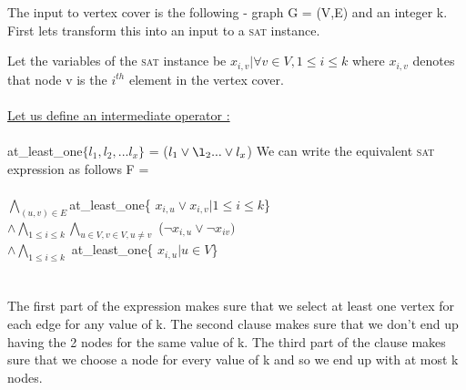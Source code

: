\documentclass[11pt]{article}
\begin{document}
The input to vertex cover is the following - graph G = (V,E) and an integer k. First lets transform this into an input to a \textsc{sat} instance.

Let the variables of the \textsc{sat} instance be $x_{i,v} |  \forall v \in V , 1 \leq i \leq k$ where $x_{i,v}$ denotes that node v is the $i^{th}$ element in the vertex cover.\\\\
\underline{Let us define an intermediate operator :}\\\\
at\_least\_one$\{l_1, l_2, ... l_x\}$ = 
($l_1 \vee \l_2 ... \vee l_x$)
\newpage
We can write the equivalent \textsc{sat} expression as follows F = \\\\ 
$\bigwedge\limits_{(u,v) \in E}$at\_least\_one\{ $x_{i,u} \vee x_{i,v}| 1 \leq i \leq k$\}\\
$\wedge \bigwedge\limits_{1 \leq i \leq k}\bigwedge\limits_{u \in V, v \in V, u \neq v}$ ($\neg{x_{i,u}} \vee \neg{x_{iv}})$\\
$\wedge \bigwedge\limits_{1 \leq i \leq k}$ at\_least\_one\{ $x_{i,u} | u \in V$\}\\\\\\
The first part of the expression makes sure that we select at least one vertex for each edge for any value of k. The second clause makes sure that we don't end up having the 2 nodes for the same value of k. 
The third part of the clause makes sure that we choose a node for every value of k and so we end up with at most k nodes.
\end{document}
